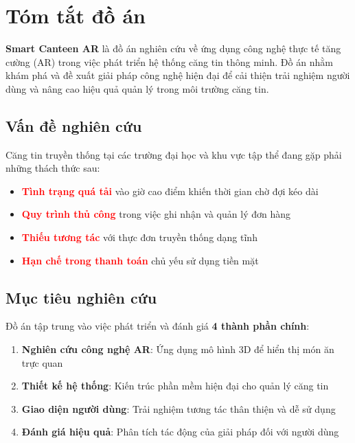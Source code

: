 \documentclass[12pt,a4paper]{article}
\begin{document}
\newpage


\section*{Tóm tắt đồ án} %

\begin{tcolorbox}[colback=blue!5!white,colframe=darkblue,title=\textbf{Mục tiêu nghiên cứu}]
\textbf{Smart Canteen AR} là đồ án nghiên cứu về ứng dụng công nghệ thực tế tăng cường (AR) trong việc phát triển hệ thống căng tin thông minh. Đồ án nhằm khám phá và đề xuất giải pháp công nghệ hiện đại để cải thiện trải nghiệm người dùng và nâng cao hiệu quả quản lý trong môi trường căng tin.
\end{tcolorbox}

\subsection*{Vấn đề nghiên cứu}
Căng tin truyền thống tại các trường đại học và khu vực tập thể đang gặp phải những thách thức sau:
\begin{itemize}[leftmargin=1cm]
    \item \textcolor{red}{\textbf{Tình trạng quá tải}} vào giờ cao điểm khiến thời gian chờ đợi kéo dài
    \item \textcolor{red}{\textbf{Quy trình thủ công}} trong việc ghi nhận và quản lý đơn hàng
    \item \textcolor{red}{\textbf{Thiếu tương tác}} với thực đơn truyền thống dạng tĩnh
    \item \textcolor{red}{\textbf{Hạn chế trong thanh toán}} chủ yếu sử dụng tiền mặt
\end{itemize}

\subsection*{Mục tiêu nghiên cứu}
Đồ án tập trung vào việc phát triển và đánh giá \textbf{4 thành phần chính}:
\begin{enumerate}
    \item \textbf{Nghiên cứu công nghệ AR}: Ứng dụng mô hình 3D để hiển thị món ăn trực quan
    \item \textbf{Thiết kế hệ thống}: Kiến trúc phần mềm hiện đại cho quản lý căng tin
    \item \textbf{Giao diện người dùng}: Trải nghiệm tương tác thân thiện và dễ sử dụng
    \item \textbf{Đánh giá hiệu quả}: Phân tích tác động của giải pháp đối với người dùng
\end{enumerate}
\end{document}
